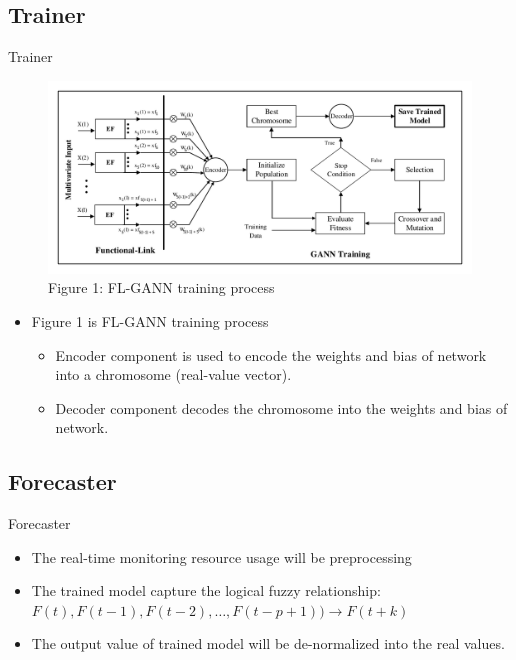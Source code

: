 \documentclass{beamer}
\newcommand{\notesize}{\fontsize{8}{10}\selectfont}
\begin{document}
\subsection{Trainer}
\begin{frame}{Trainer}

\begin{figure}
		\centering
		\includegraphics[width=0.8 \textwidth]{FLGANN_process.pdf} %
		\caption*{\notesize Figure 1: FL-GANN training process}
		\label{fig:preprocessing}			
	\end{figure}
	\begin{itemize}
		\item{Figure 1 is FL-GANN training process}
		\begin{itemize}
			\item{\notesize Encoder component is used to encode the weights and bias of network into a chromosome (real-value vector). }
			\item{ \notesize Decoder component decodes the chromosome into the weights and bias of network. }
		\end{itemize}
	\end{itemize}
	
\end{frame}


\subsection{Forecaster}
\begin{frame}{Forecaster}
		\begin{itemize}
			\item The real-time monitoring resource usage will be preprocessing
			\item The trained model capture the logical fuzzy relationship: $F(t), F(t-1), F(t-2), \dots, F(t-p+1)) \rightarrow F(t+k)$
			\item The output value of trained model will be de-normalized into the real values.
		\end{itemize}

\end{frame}
\end{document}
